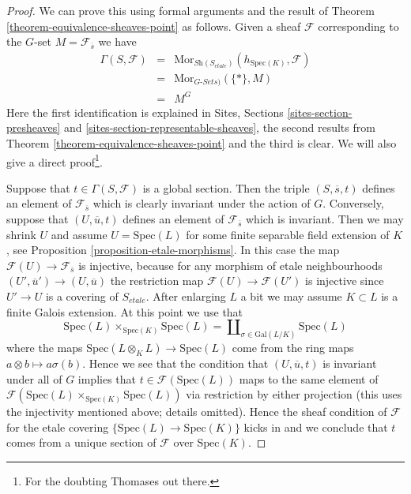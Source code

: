 \begin{proof}
We can prove this using formal arguments and the result of
Theorem \ref{theorem-equivalence-sheaves-point}
as follows. Given a sheaf $\mathcal{F}$ corresponding to
the $G$-set $M = \mathcal{F}_{\overline{s}}$ we have
\begin{eqnarray*}
\Gamma(S, \mathcal{F}) & = &
\text{Mor}_{\textit{Sh}(S_{etale})}(h_{\text{Spec}(K)},  \mathcal{F})
\\
& = & \text{Mor}_{G\textit{-Sets})}(\{*\}, M) \\
& = & M^G
\end{eqnarray*}
Here the first identification is explained in
Sites, Sections \ref{sites-section-presheaves} and
\ref{sites-section-representable-sheaves},
the second results from
Theorem \ref{theorem-equivalence-sheaves-point}
and the third is clear. We will also give a direct proof\footnote{For
the doubting Thomases out there.}.

\medskip\noindent
Suppose that $t \in \Gamma(S, \mathcal{F})$ is a global section.
Then the triple $(S, \overline{s}, t)$ defines an element of
$\mathcal{F}_{\overline{s}}$ which is clearly invariant under the
action of $G$. Conversely, suppose that $(U, \overline{u}, t)$
defines an element of $\mathcal{F}_{\overline{s}}$ which is invariant.
Then we may shrink $U$ and assume $U = \text{Spec}(L)$ for some
finite separable field extension of $K$, see
Proposition \ref{proposition-etale-morphisms}.
In this case the map $\mathcal{F}(U) \to \mathcal{F}_{\overline{s}}$
is injective, because for any morphism of etale neighbourhoods
$(U', \overline{u}') \to (U, \overline{u})$ the restriction map
$\mathcal{F}(U) \to \mathcal{F}(U')$ is injective since $U' \to U$
is a covering of $S_{etale}$.
After enlarging $L$ a bit we may assume $K \subset L$ is a finite
Galois extension. At this point we use that
$$
\text{Spec}(L) \times_{\text{Spec}(K)} \text{Spec}(L)
=
\coprod\nolimits_{\sigma \in \text{Gal}(L/K)} \text{Spec}(L)
$$
where the maps $\text{Spec}(L \otimes_K L) \to \text{Spec}(L)$
come from the ring maps $a \otimes b \mapsto a\sigma(b)$. Hence we
see that the condition that $(U, \overline{u}, t)$ is invariant
under all of $G$ implies that $t \in \mathcal{F}(\text{Spec}(L))$
maps to the same element of
$\mathcal{F}(\text{Spec}(L) \times_{\text{Spec}(K)} \text{Spec}(L))$
via restriction by either projection (this uses the injectivity mentioned
above; details omitted). Hence the sheaf condition of $\mathcal{F}$
for the etale covering $\{\text{Spec}(L) \to \text{Spec}(K)\}$ kicks
in and we conclude that $t$ comes from a unique section of $\mathcal{F}$
over $\text{Spec}(K)$.
\end{proof}

